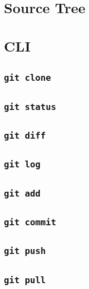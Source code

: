\documentclass[
  letterpaper,
  DIV=11,
  numbers=noendperiod]{scrreprt}
\theoremstyle{definition}
\theoremstyle{remark}
\begin{document}
\section{Source Tree}\label{source-tree}

\section{CLI}\label{cli}

\subsection{\texorpdfstring{\texttt{git\ clone}}{git clone}}\label{git-clone}

\subsection{\texorpdfstring{\texttt{git\ status}}{git status}}\label{git-status}

\subsection{\texorpdfstring{\texttt{git\ diff}}{git diff}}\label{git-diff}

\subsection{\texorpdfstring{\texttt{git\ log}}{git log}}\label{git-log}

\subsection{\texorpdfstring{\texttt{git\ add}}{git add}}\label{git-add}

\subsection{\texorpdfstring{\texttt{git\ commit}}{git commit}}\label{git-commit}

\subsection{\texorpdfstring{\texttt{git\ push}}{git push}}\label{git-push}

\subsection{\texorpdfstring{\texttt{git\ pull}}{git pull}}\label{git-pull}
\end{document}
